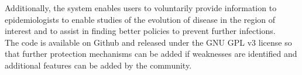 Additionally, the system enables users to voluntarily provide information to epidemiologists to enable studies of the evolution of disease in the region of interest and to assist in finding better policies to prevent further infections.\\

The code is available on Github and released under the GNU GPL v3 license so that further protection mechanisms can be added if weaknesses are identified and additional features can be added by the community.
%
%

